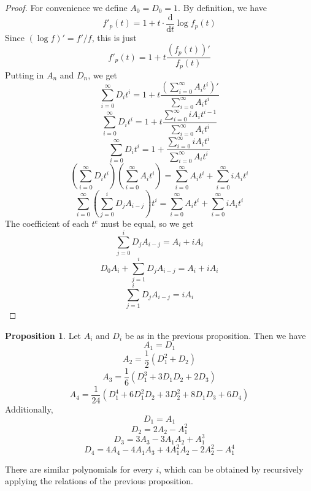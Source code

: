 \documentclass[a4paper]{article}
\theoremstyle{definition}
\newtheorem{proposition}[theorem]{Proposition}
\theoremstyle{remark}
\begin{document}
\begin{proof}
For convenience we define $A_0 = D_0 = 1$. By definition, we have 
$$f'_p(t) = 1 + t \cdot \frac{\mathrm{d}}{\mathrm{d}t} \log  f_p(t)$$
Since $(\log f)' = f'/f$, this is just 
$$f'_p(t) = 1 + t \frac{(f_p(t))'}{f_p(t)}$$
Putting in $A_n$ and $D_n$, we get
$$\sum_{i = 0}^\infty D_i t^i = 1 + t \frac{\left(\sum_{i = 0}^\infty A_i t^i\right)'}{\sum_{i = 0}^\infty A_i t^i}$$
$$\sum_{i = 0}^\infty D_i t^i = 1 + t \frac{\sum_{i = 0}^\infty i A_i t^{i - 1}}{\sum_{i = 0}^\infty A_i t^i}$$
$$\sum_{i = 0}^\infty D_i t^i = 1 + \frac{\sum_{i = 0}^\infty i A_i t^{i}}{\sum_{i = 0}^\infty A_i t^i}$$
$$\left(\sum_{i = 0}^\infty D_i t^i\right) \left(\sum_{i = 0}^\infty A_i t^i\right) = \sum_{i = 0}^\infty A_i t^i + \sum_{i = 0}^\infty i A_i t^{i}$$
$$\sum_{i = 0}^\infty \left(\sum_{j = 0}^i D_j A_{i - j}\right) t^i = \sum_{i = 0}^\infty A_i t^i + \sum_{i = 0}^\infty i A_i t^{i}$$
The coefficient of each $t^e$ must be equal, so we get
$$\sum_{j = 0}^i D_j A_{i - j} = A_i + iA_i$$
$$D_0 A_i + \sum_{j = 1}^i D_j A_{i - j} = A_i + iA_i$$
$$\sum_{j = 1}^i D_j A_{i - j} = iA_i$$
\qedhere
\end{proof}

\begin{proposition}
Let $A_i$ and $D_i$ be as in the previous proposition. Then we have
$$A_1 = D_1$$
$$A_2 = \frac{1}{2}(D_1^2 + D_2)$$
$$A_3 = \frac{1}{6}(D_1^3 + 3D_1D_2 + 2D_3)$$
$$A_4 = \frac{1}{24}(D_1^4 + 6D_1^2D_2 + 3D_2^2 + 8D_1D_3 + 6D_4)$$
Additionally, 
$$D_1 = A_1$$
$$D_2 = 2A_2 - A_1^2$$
$$D_3 = 3A_3 - 3A_1A_2 + A_1^3$$
$$D_4 = 4A_4 - 4A_1A_3 + 4A_1^2A_2 - 2A_2^2 - A_1^4$$
\end{proposition}
There are similar polynomials for every $i$, which can be obtained by recursively applying the relations of the previous proposition.
\end{document}

